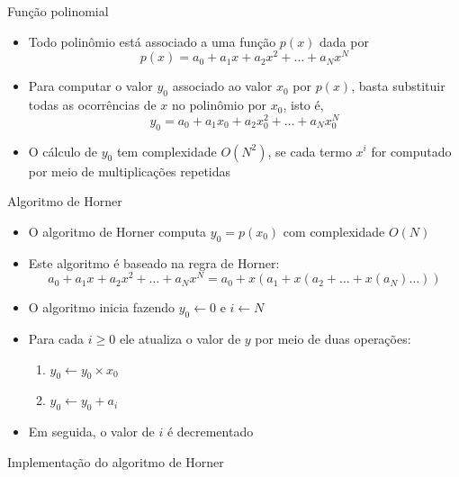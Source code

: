 \begin{frame}[fragile]{Função polinomial}

    \begin{itemize}
        \item Todo polinômio está associado a uma função $p(x)$ dada por
$$
p(x) = a_0 + a_1x + a_2x^2 + \ldots + a_Nx^N
$$

        \item Para computar o valor $y_0$ associado ao valor $x_0$ por $p(x)$, basta substituir todas as ocorrências de $x$ no polinômio por $x_0$, isto é,
$$
y_0 = a_0 + a_1x_0 + a_2x_0^2 + \ldots + a_Nx_0^N
$$

        \item O cálculo de $y_0$ tem complexidade $O(N^2)$, se cada termo $x^i$ for computado por meio de multiplicações repetidas
    \end{itemize}

\end{frame}

\begin{frame}[fragile]{Algoritmo de Horner}

    \begin{itemize}
        \item O algoritmo de Horner computa $y_0 = p(x_0)$ com complexidade $O(N)$

        \item Este algoritmo é baseado na regra de Horner:
$$
a_0 + a_1x + a_2x^2 + \ldots + a_Nx^N = a_0 + x(a_1 + x(a_2 + \ldots + x(a_N) \ldots ))
$$

        \item O algoritmo inicia fazendo $y_0 \leftarrow 0$ e $i \leftarrow N$

        \item Para cada $i \geq 0$ ele atualiza o valor de $y$ por meio de duas operações:
        \begin{enumerate}
            \item $y_0 \leftarrow y_0 \times x_0$
            \item $y_0 \leftarrow y_0 + a_i$
        \end{enumerate}

        \item Em seguida, o valor de $i$ é decrementado
    \end{itemize}

\end{frame}

\begin{frame}[fragile]{Implementação do algoritmo de Horner}


\end{frame}

